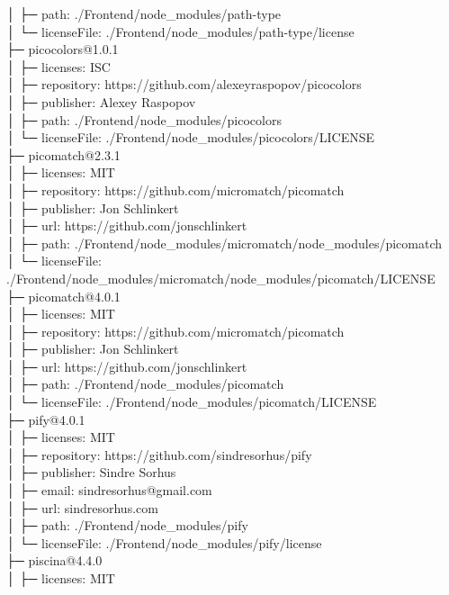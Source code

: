 │  ├─ path: ./Frontend/node\_modules/path-type\\
│  └─ licenseFile: ./Frontend/node\_modules/path-type/license\\
├─ picocolors@1.0.1\\
│  ├─ licenses: ISC\\
│  ├─ repository: https://github.com/alexeyraspopov/picocolors\\
│  ├─ publisher: Alexey Raspopov\\
│  ├─ path: ./Frontend/node\_modules/picocolors\\
│  └─ licenseFile: ./Frontend/node\_modules/picocolors/LICENSE\\
├─ picomatch@2.3.1\\
│  ├─ licenses: MIT\\
│  ├─ repository: https://github.com/micromatch/picomatch\\
│  ├─ publisher: Jon Schlinkert\\
│  ├─ url: https://github.com/jonschlinkert\\
│  ├─ path: ./Frontend/node\_modules/micromatch/node\_modules/picomatch\\
│  └─ licenseFile: ./Frontend/node\_modules/micromatch/node\_modules/picomatch/LICENSE\\
├─ picomatch@4.0.1\\
│  ├─ licenses: MIT\\
│  ├─ repository: https://github.com/micromatch/picomatch\\
│  ├─ publisher: Jon Schlinkert\\
│  ├─ url: https://github.com/jonschlinkert\\
│  ├─ path: ./Frontend/node\_modules/picomatch\\
│  └─ licenseFile: ./Frontend/node\_modules/picomatch/LICENSE\\
├─ pify@4.0.1\\
│  ├─ licenses: MIT\\
│  ├─ repository: https://github.com/sindresorhus/pify\\
│  ├─ publisher: Sindre Sorhus\\
│  ├─ email: sindresorhus@gmail.com\\
│  ├─ url: sindresorhus.com\\
│  ├─ path: ./Frontend/node\_modules/pify\\
│  └─ licenseFile: ./Frontend/node\_modules/pify/license\\
├─ piscina@4.4.0\\
│  ├─ licenses: MIT\\
